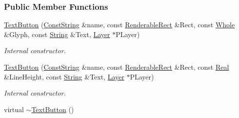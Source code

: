 \subsubsection*{Public Member Functions}
\begin{DoxyCompactItemize}
\item 
\hyperlink{classphys_1_1UI_1_1TextButton_a0ac20e0541794bbc6d708fe3be6acb26}{TextButton} (\hyperlink{namespacephys_a5ce5049f8b4bf88d6413c47b504ebb31}{ConstString} \&name, const \hyperlink{structphys_1_1UI_1_1RenderableRect}{RenderableRect} \&Rect, const \hyperlink{namespacephys_a460f6bc24c8dd347b05e0366ae34f34a}{Whole} \&Glyph, const \hyperlink{namespacephys_aa03900411993de7fbfec4789bc1d392e}{String} \&Text, \hyperlink{classphys_1_1UI_1_1Layer}{Layer} $\ast$PLayer)
\begin{DoxyCompactList}\small\item\em Internal constructor. \item\end{DoxyCompactList}\item 
\hyperlink{classphys_1_1UI_1_1TextButton_aa7cf2c89310ead3a15413ca1a278253e}{TextButton} (\hyperlink{namespacephys_a5ce5049f8b4bf88d6413c47b504ebb31}{ConstString} \&name, const \hyperlink{structphys_1_1UI_1_1RenderableRect}{RenderableRect} \&Rect, const \hyperlink{namespacephys_af7eb897198d265b8e868f45240230d5f}{Real} \&LineHeight, const \hyperlink{namespacephys_aa03900411993de7fbfec4789bc1d392e}{String} \&Text, \hyperlink{classphys_1_1UI_1_1Layer}{Layer} $\ast$PLayer)
\begin{DoxyCompactList}\small\item\em Internal constructor. \item\end{DoxyCompactList}\item 
\hypertarget{classphys_1_1UI_1_1TextButton_a1f28489fee45ee8ce7e1b0aea0f249a1}{
virtual \hyperlink{classphys_1_1UI_1_1TextButton_a1f28489fee45ee8ce7e1b0aea0f249a1}{$\sim$TextButton} ()}
\label{classphys_1_1UI_1_1TextButton_a1f28489fee45ee8ce7e1b0aea0f249a1}


\end{DoxyCompactItemize}
